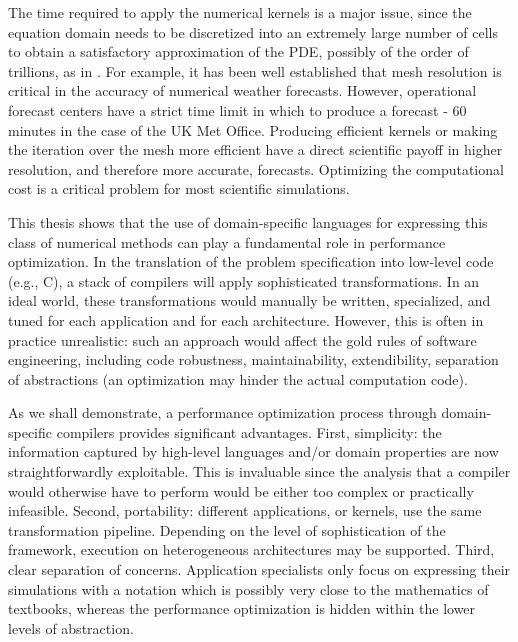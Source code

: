 The time required to apply the numerical kernels is a major issue, since the equation domain needs to be discretized into an extremely large number of cells to obtain a satisfactory approximation of the PDE, possibly of the order of trillions, as in \cite{Rossinelli2013}. For example, it has been well established that mesh resolution is critical in the accuracy of numerical weather forecasts. However, operational forecast centers have a strict time limit in which to produce a forecast - 60 minutes in the case of the UK Met Office. Producing efficient kernels or making the iteration over the mesh more efficient have a direct scientific payoff in higher resolution, and therefore more accurate, forecasts. Optimizing the computational cost is a critical problem for most scientific simulations.

This thesis shows that the use of domain-specific languages for expressing this class of numerical methods can play a fundamental role in performance optimization. In the translation of the problem specification into low-level code (e.g., C), a stack of compilers will apply sophisticated transformations. In an ideal world, these transformations would manually be written, specialized, and tuned for each application and for each architecture. However, this is often in practice unrealistic: such an approach would affect the gold rules of software engineering, including code robustness, maintainability, extendibility, separation of abstractions (an optimization may hinder the actual computation code).

As we shall demonstrate, a performance optimization process through domain-specific compilers provides significant advantages. First, simplicity: the information captured by high-level languages and/or domain properties are now straightforwardly exploitable. This is invaluable since the analysis that a compiler would otherwise have to perform would be either too complex or practically infeasible. Second, portability: different applications, or kernels, use the same transformation pipeline. Depending on the level of sophistication of the framework, execution on heterogeneous architectures may be supported. Third, clear separation of concerns. Application specialists only focus on expressing their simulations with a notation which is possibly very close to the mathematics of textbooks, whereas the performance optimization is hidden within the lower levels of abstraction. 

